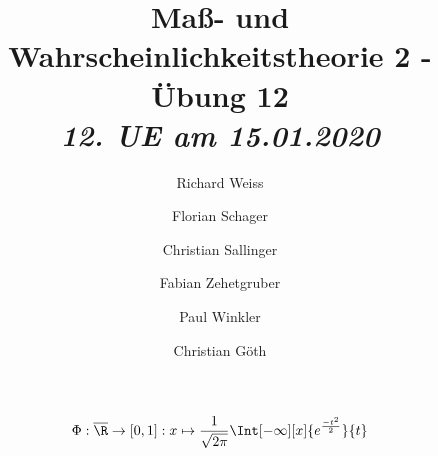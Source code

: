 \documentclass{article}
\title
{
  Maß- und Wahrscheinlichkeitstheorie 2 - Übung 12\\
  \vspace{4pt}
  \normalsize
  \textit{12. UE am 15.01.2020}
}
\author
{
  Richard Weiss       \and
  Florian Schager     \and
  Christian Sallinger \and
  Fabian Zehetgruber  \and
  Paul Winkler        \and
  Christian Göth
}
\date{}
\begin{document}
\maketitle

\begin{align*}
  \Phi:
  \overline{\R} \to [0, 1]:
  x \mapsto \frac{1}{\sqrt{2 \pi}} \Int[-\infty][x]{e^\frac{-t^2}{2}}{t}
\end{align*}








\end{document}
